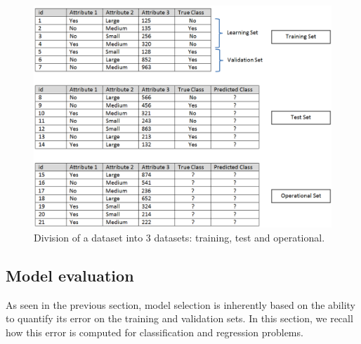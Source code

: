 \begin{figure}[h!]
	\centering
	\includegraphics[width=0.9\linewidth]{images/Dataset}
	\caption{Division of a dataset into 3 datasets: training, test and operational.}
	\label{fig:Dataset}
\end{figure}




\newpage
\subsection{Model evaluation}

As seen in the previous section, model selection is inherently based on the ability to quantify its error on the training and validation sets. In this section, we recall how this error is computed for classification and regression problems.

